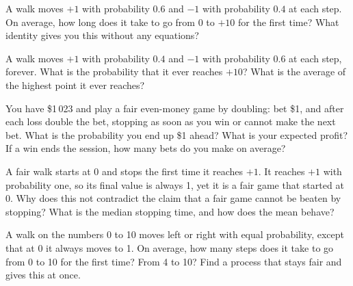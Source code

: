\begin{question}\label{iq:iv1:random-walks-and-martingales:5}
A walk moves $+1$ with probability $0.6$ and $-1$ with probability $0.4$ at each step. On average, how long does it take to go from 0 to $+10$ for the first time? What identity gives you this without any equations?
\end{question}

\begin{question}\label{iq:iv1:random-walks-and-martingales:6}
A walk moves $+1$ with probability $0.4$ and $-1$ with probability $0.6$ at each step, forever. What is the probability that it ever reaches $+10$? What is the average of the highest point it ever reaches?
\end{question}

\begin{question}\label{iq:iv1:random-walks-and-martingales:7}
You have \$1\,023 and play a fair even-money game by doubling: bet \$1, and after each loss double the bet, stopping as soon as you win or cannot make the next bet. What is the probability you end up \$1 ahead? What is your expected profit? If a win ends the session, how many bets do you make on average?
\end{question}

\begin{question}\label{iq:iv1:random-walks-and-martingales:8}
A fair walk starts at 0 and stops the first time it reaches $+1$. It reaches $+1$ with probability one, so its final value is always 1, yet it is a fair game that started at 0. Why does this not contradict the claim that a fair game cannot be beaten by stopping? What is the median stopping time, and how does the mean behave?
\end{question}

\begin{question}\label{iq:iv1:random-walks-and-martingales:9}
A walk on the numbers 0 to 10 moves left or right with equal probability, except that at 0 it always moves to 1. On average, how many steps does it take to go from 0 to 10 for the first time? From 4 to 10? Find a process that stays fair and gives this at once.
\end{question}

